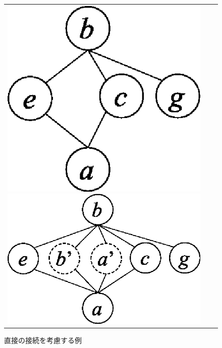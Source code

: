 \begin{figure}[htbp]
\begin{center}
\begin{tabular}{ccc}
\begin{minipage}{0.3\hsize}
\begin{center}
\includegraphics[scale=0.5]{./ab1.eps}
\caption{直接の接続を考慮しない例\label{fig:ab1}}
\end{center}
\end{minipage}

\begin{minipage}{0.3\hsize}
\begin{center}
\includegraphics[scale=0.5]{./ab3.eps}
\caption{直接の接続を考慮する例\label{fig:ab3}}
\end{center}
\end{minipage}

\end{tabular}
\end{center}
\end{figure}

